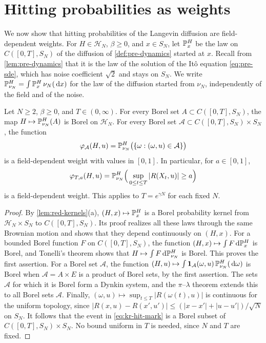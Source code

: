 \section{Hitting probabilities as weights}\label{sec:kr-hitting}

We now show that hitting probabilities of the Langevin diffusion are field-dependent weights. For $H\in\mathcal H_N$, $\beta\ge0$, and $x\in S_N$, let $\mathbb P^H_x$ be the law on $C([0,T],S_N)$ of the diffusion of \cref{def:pre-dynamics} started at $x$. Recall from \cref{lem:pre-dynamics} that it is the law of the solution of the It\^o equation \eqref{eq:pre-sde}, which has noise coefficient $\sqrt2$ and stays on $S_N$. We write $\mathbb P^H_{\nu_N}=\int\mathbb P^H_x\,\nu_N(\,\mathrm d x)$ for the law of the diffusion started from $\nu_N$, independently of the field and of the noise.

\begin{lemma}\label{lem:kr-hitting}
Let $N\ge2$, $\beta\ge0$, and $T\in(0,\infty)$. For every Borel set $A\subset C([0,T],S_N)$, the map $H\mapsto\mathbb P^H_{\nu_N}(A)$ is Borel on $\mathcal H_N$. For every Borel set $\mathcal A\subset C([0,T],S_N)\times S_N$, the function
\[
\varphi_{\mathcal A}(H,u)=\mathbb P^H_{\nu_N}\big(\{\omega:(\omega,u)\in\mathcal A\}\big)
\]
is a field-dependent weight with values in $[0,1]$. In particular, for $a\in[0,1]$,
\begin{equation}\label{eq:kr-hit-mark}
\varphi_{T,a}(H,u)=\mathbb P^H_{\nu_N}\Big(\sup_{0\le t\le T}|R(X_t,u)|\ge a\Big)
\end{equation}
is a field-dependent weight. This applies to $T=e^{\gamma N}$ for each fixed $N$.
\end{lemma}

\begin{proof}
By \cref{lem:red-kernels}(a), $(H,x)\mapsto\mathbb P^H_x$ is a Borel probability kernel from $\mathcal H_N\times S_N$ to $C([0,T],S_N)$. Its proof realizes all these laws through the same Brownian motion and shows that they depend continuously on $(H,x)$. For a bounded Borel function $F$ on $C([0,T],S_N)$, the function $(H,x)\mapsto\int F\,\mathrm d\mathbb P^H_x$ is Borel, and Tonelli's theorem shows that $H\mapsto\int F\,\mathrm d\mathbb P^H_{\nu_N}$ is Borel. This proves the first assertion. For a Borel set $\mathcal A$, the function $(H,u)\mapsto\int\mathbf 1_{\mathcal A}(\omega,u)\,\mathbb P^H_{\nu_N}(\,\mathrm d\omega)$ is Borel when $\mathcal A=A\times E$ is a product of Borel sets, by the first assertion. The sets $\mathcal A$ for which it is Borel form a Dynkin system, and the $\pi$--$\lambda$ theorem extends this to all Borel sets $\mathcal A$. Finally, $(\omega,u)\mapsto\sup_{t\le T}|R(\omega(t),u)|$ is continuous for the uniform topology, since $|R(x,u)-R(x',u')|\le(|x-x'|+|u-u'|)/\sqrt N$ on $S_N$. It follows that the event in \eqref{eq:kr-hit-mark} is a Borel subset of $C([0,T],S_N)\times S_N$. No bound uniform in $T$ is needed, since $N$ and $T$ are fixed.
\end{proof}

